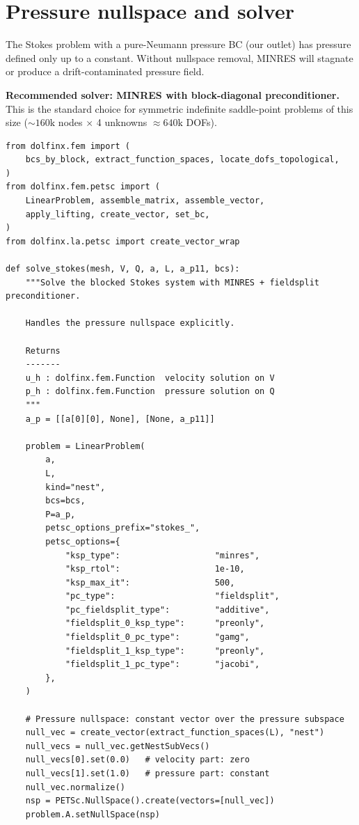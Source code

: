 \documentclass[11pt]{article}
\begin{document}
\section{Pressure nullspace and solver}
\label{sec:solver}

The Stokes problem with a pure-Neumann pressure BC (our outlet) has
pressure defined only up to a constant. Without nullspace removal, MINRES
will stagnate or produce a drift-contaminated pressure field.

\textbf{Recommended solver: MINRES with block-diagonal preconditioner.}
This is the standard choice for symmetric indefinite saddle-point problems
of this size ($\sim 160\text{k}$ nodes $\times$ 4 unknowns $\approx 640\text{k}$ DOFs).

\begin{lstlisting}
from dolfinx.fem import (
    bcs_by_block, extract_function_spaces, locate_dofs_topological,
)
from dolfinx.fem.petsc import (
    LinearProblem, assemble_matrix, assemble_vector,
    apply_lifting, create_vector, set_bc,
)
from dolfinx.la.petsc import create_vector_wrap

def solve_stokes(mesh, V, Q, a, L, a_p11, bcs):
    """Solve the blocked Stokes system with MINRES + fieldsplit preconditioner.

    Handles the pressure nullspace explicitly.

    Returns
    -------
    u_h : dolfinx.fem.Function  velocity solution on V
    p_h : dolfinx.fem.Function  pressure solution on Q
    """
    a_p = [[a[0][0], None], [None, a_p11]]

    problem = LinearProblem(
        a,
        L,
        kind="nest",
        bcs=bcs,
        P=a_p,
        petsc_options_prefix="stokes_",
        petsc_options={
            "ksp_type":                   "minres",
            "ksp_rtol":                   1e-10,
            "ksp_max_it":                 500,
            "pc_type":                    "fieldsplit",
            "pc_fieldsplit_type":         "additive",
            "fieldsplit_0_ksp_type":      "preonly",
            "fieldsplit_0_pc_type":       "gamg",
            "fieldsplit_1_ksp_type":      "preonly",
            "fieldsplit_1_pc_type":       "jacobi",
        },
    )

    # Pressure nullspace: constant vector over the pressure subspace
    null_vec = create_vector(extract_function_spaces(L), "nest")
    null_vecs = null_vec.getNestSubVecs()
    null_vecs[0].set(0.0)   # velocity part: zero
    null_vecs[1].set(1.0)   # pressure part: constant
    null_vec.normalize()
    nsp = PETSc.NullSpace().create(vectors=[null_vec])
    problem.A.setNullSpace(nsp)


\end{lstlisting}
\end{document}

